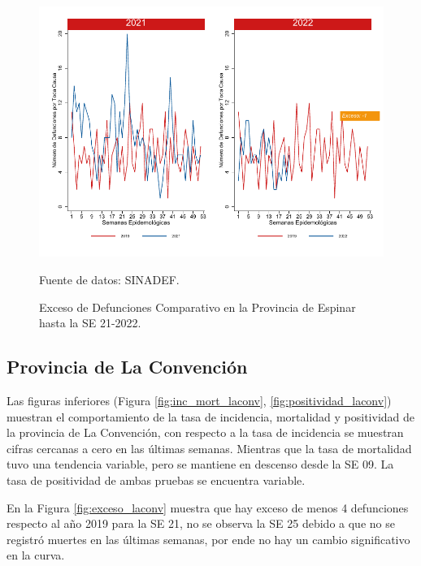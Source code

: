 \documentclass[12pt,a4paper,openany]{book}
\begin{document}
	\begin{figure}[h]
		\caption{Exceso de Defunciones Comparativo en la Provincia de Espinar hasta la SE 21-2022.}\label{fig:exceso_espinar}
		\begin{center}
			\includegraphics[width=0.7\linewidth]{../figuras/exceso_8.pdf}
		\end{center}
		{\footnotesize {Fuente de datos: SINADEF.}}
	\end{figure}
	
	\clearpage
	
	\subsection*{Provincia de La Convención}
	\noindent Las figuras inferiores (Figura \ref{fig:inc_mort_laconv}, \ref{fig:positividad_laconv}) muestran el comportamiento de la tasa de incidencia, mortalidad y positividad de la provincia de La Convención, con respecto a la tasa de incidencia se muestran cifras cercanas a cero en las últimas semanas. Mientras que la tasa de mortalidad tuvo una tendencia variable, pero se mantiene en descenso desde la SE 09. La tasa de positividad de ambas pruebas se encuentra variable.
	
	En la Figura \ref{fig:exceso_laconv} muestra que hay exceso de menos 4 defunciones respecto al año 2019 para la SE 21, no se observa la SE 25 debido a que no se registró muertes en las últimas semanas, por ende no hay un cambio significativo en la curva.    
	
\end{document}
